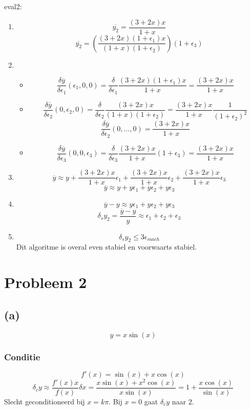 \documentclass[12pt,a4paper]{article}
\begin{document}
eval2:
\begin{enumerate}
\item
\[
\overline{y_2}=
\frac{(3+2x)x}{1+x}
\]
\[
\overline{y_2} = \left(\frac{(3+2x)(1+\epsilon_1)x}{(1+x)(1+\epsilon_2)}\right)(1+\epsilon_3)
\]


\item
\begin{itemize}
\item
\[
\frac{\delta\overline{y}}{\delta\epsilon_1}(\epsilon_1,0,0)
= \frac{\delta}{\delta\epsilon_1}\frac{(3+2x)(1+\epsilon_1)x}{1+x}
= \frac{(3+2x)x}{1+x}
\]

\item
\[
\frac{\delta\overline{y}}{\delta\epsilon_2}(0,\epsilon_2,0)
= \frac{\delta}{\delta\epsilon_2}\frac{(3+2x)x}{(1+x)(1+\epsilon_2)}
= \frac{(3+2x)x}{1+x}\frac{1}{(1+\epsilon_2)^2}
\]
\[
\frac{\delta\overline{y}}{\delta\epsilon_2}(0,...,0)
= \frac{(3+2x)x}{1+x}
\]

\item
\[
\frac{\delta\overline{y}}{\delta\epsilon_3}(0,0,\epsilon_3)
= \frac{\delta}{\delta\epsilon_3}\frac{(3+2x)x}{1+x}(1+\epsilon_3)
= \frac{(3+2x)x}{1+x}
\]

\end{itemize}
\item
\[
\overline{y} \approx y
+ \frac{(3+2x)x}{1+x}\epsilon_1
+ \frac{(3+2x)x}{1+x}\epsilon_2
+ \frac{(3+2x)x}{1+x}\epsilon_3
\]
\[
\overline{y} \approx y
+ y\epsilon_1
+ y\epsilon_2
+ y\epsilon_3
\]

\item
\[
\overline{y} - y
\approx
  y\epsilon_1
+ y\epsilon_2
+ y\epsilon_3
\]
\[
\delta_{s}y_2
= \frac{\overline{y} - y}{y}
\approx
  \epsilon_1
+ \epsilon_2
+ \epsilon_3
\]
\item
\[
\delta_{s}y_2 \le  3\epsilon_{mach}
\]
Dit algoritme is overal even stabiel en voorwaarts stabiel.
\end{enumerate}


\section{Probleem 2}
\subsection*{(a)}
\[
y = x\sin(x)
\]

\subsubsection*{Conditie}
\[
f'(x) = \sin(x) + x\cos(x)
\]
\[
\delta_cy \approx \frac{f'(x)x}{f(x)}\delta x
= \frac{x\sin(x) + x^2\cos(x)}{x\sin(x)}
= 1+\frac{x\cos(x)}{\sin(x)}
\]
Slecht geconditioneerd bij $x=k\pi$.
Bij $x=0$ gaat $\delta_cy$ naar $2$.
\end{document}
